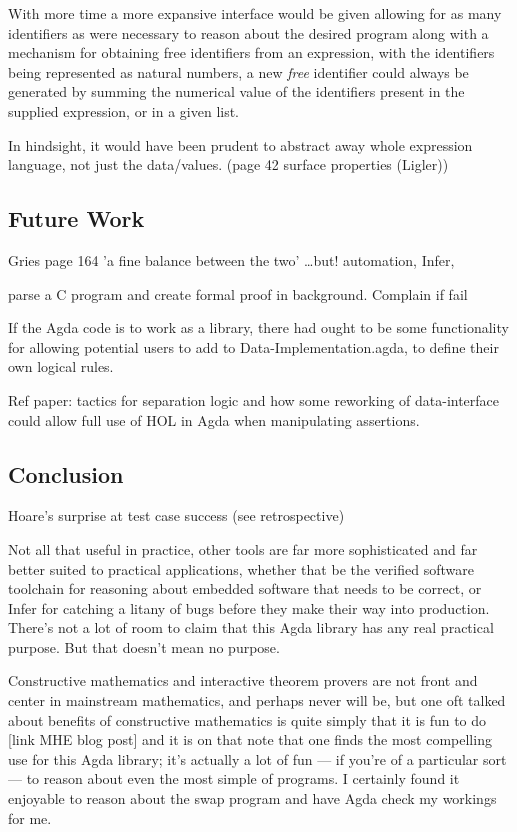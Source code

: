 \documentclass[oneside,12pt]{article}
\begin{document}
With more time a more expansive interface would be given allowing for as many identifiers as were necessary to reason about the desired program along with a mechanism for obtaining free identifiers from an expression, with the identifiers being represented as natural numbers, a new \emph{free} identifier could always be generated by summing the numerical value of the identifiers present in the supplied expression, or in a given list.


In hindsight, it would have been prudent to abstract away whole expression language, not just the data/values.
(page 42 surface properties (Ligler))

\subsection{Future Work}

Gries page 164 'a fine balance between the two' 
\ldots but! automation, Infer,


parse a C program and create formal proof in background. Complain if fail

If the Agda code is to work as a library, there had ought to be some functionality for allowing potential users to add to Data-Implementation.agda, to define their own logical rules.


Ref paper: tactics for separation logic and how some reworking of data-interface could allow full use of HOL in Agda when manipulating assertions.


\subsection{Conclusion}

Hoare's surprise at test case success (see retrospective)

Not all that useful in practice, other tools are far more sophisticated and far better suited to practical applications, whether that be the verified software toolchain for reasoning about embedded software that needs to be correct, or Infer for catching a litany of bugs before they make their way into production. There's not a lot of room to claim that this Agda library has any real practical purpose. But that doesn't mean no purpose.

Constructive mathematics and interactive theorem provers are not front and center in mainstream mathematics, and perhaps never will be, but one oft talked about benefits of constructive mathematics is quite simply that it is fun to do [link MHE blog post] and it is on that note that one finds the most compelling use for this Agda library; it's actually a lot of fun --- if you're of a particular sort --- to reason about even the most simple of programs. I certainly found it enjoyable to reason about the swap program and have Agda check my workings for me.
\end{document}
